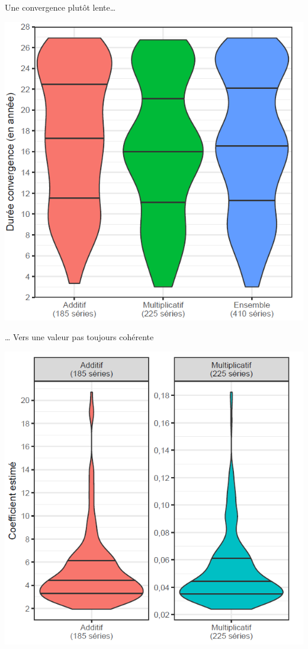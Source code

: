 \documentclass[10pt,xcolor=table,color={dvipsnames,usenames},ignorenonframetext,usepdftitle=false,french]{beamer}
\begin{document}
\begin{frame}{Une convergence plutôt lente\ldots{}}

\centering
\includegraphics[height = 0.9\textheight]{img/LYconvergence.png}

\end{frame}

\begin{frame}{\ldots{} Vers une valeur pas toujours cohérente}

\centering
\includegraphics[height = 0.9\textheight]{img/LYvaleur.png}

\end{frame}
\end{document}
